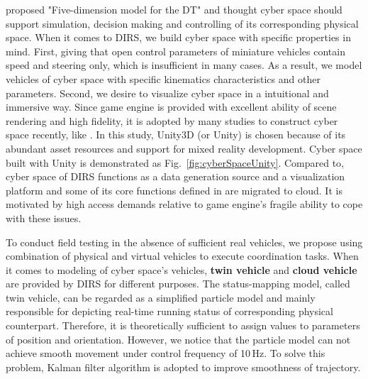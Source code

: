 \documentclass[conference]{IEEEtran}
\begin{document}
 	\cite{ref:taofei} proposed "Five-dimension model for the DT" and thought cyber space should support simulation, decision making and controlling of its corresponding physical space. When it comes to DIRS, we build cyber space with specific properties in mind. First, giving that open control parameters of miniature vehicles contain speed and steering only, which is insufficient in many cases. As a result, we model vehicles of cyber space with specific kinematics characteristics and other parameters. Second, we desire to visualize cyber space in a intuitional and immersive way. Since game engine is provided with excellent ability of scene rendering and high fidelity, it is adopted by many studies to construct cyber space recently, like \cite{ref:engine1,ref:engine2}. In this study, Unity3D (or Unity) is chosen because of its abundant asset resources and support for mixed reality development. Cyber space built with Unity is demonstrated as Fig.~\ref{fig:cyberSpaceUnity}. Compared to\cite{ref:taofei}, cyber space of DIRS functions as a data generation source and a visualization platform and some of its core functions defined in \cite{ref:taofei} are migrated to cloud. It is motivated by high access demands relative to game engine's fragile ability to cope with these issues.
		
	To conduct field testing in the absence of sufficient real vehicles, we propose using combination of physical and virtual vehicles to execute coordination tasks. When it comes to modeling of cyber space's vehicles, \textbf{twin vehicle} and \textbf{cloud vehicle} are provided by DIRS for different purposes. The status-mapping model, called twin vehicle, can be regarded as a simplified particle model and mainly responsible for depicting real-time running status of corresponding physical counterpart. Therefore, it is theoretically sufficient to assign values to parameters of position and orientation. However, we notice that the particle model can not achieve smooth movement under control frequency of 10\,Hz. To solve this problem, Kalman filter algorithm is adopted to improve smoothness of trajectory. 
	
\end{document}
